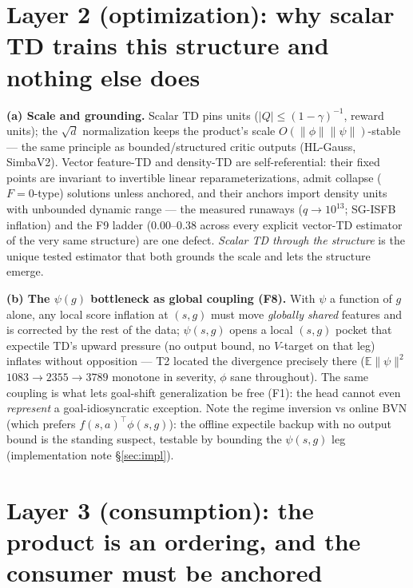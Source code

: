 \documentclass[11pt]{article}
\newcommand{\E}{\mathbb{E}}
\theoremstyle{definition}
\theoremstyle{remark}
\begin{document}
\section{Layer 2 (optimization): why scalar TD trains this structure and nothing else
does}\label{sec:layer2}

\textbf{(a) Scale and grounding.} Scalar TD pins units ($|Q|\le(1-\gamma)^{-1}$, reward
units); the $\sqrt d$ normalization keeps the product's scale $O(\|\phi\|\|\psi\|)$-stable
--- the same principle as bounded/structured critic outputs (HL-Gauss, SimbaV2). Vector
feature-TD and density-TD are self-referential: their fixed points are invariant to
invertible linear reparameterizations, admit collapse ($F{=}0$-type) solutions unless
anchored, and their anchors import density units with unbounded dynamic range --- the
measured runaways ($q\to10^{13}$; SG-ISFB inflation) and the F9 ladder ($0.00$--$0.38$
across every explicit vector-TD estimator of the very same structure) are one defect.
\emph{Scalar TD through the structure} is the unique tested estimator that both grounds the
scale and lets the structure emerge.

\textbf{(b) The $\psi(g)$ bottleneck as global coupling (F8).} With $\psi$ a function of $g$
alone, any local score inflation at $(s,g)$ must move \emph{globally shared} features and is
corrected by the rest of the data; $\psi(s,g)$ opens a local $(s,g)$ pocket that expectile
TD's upward pressure (no output bound, no $V$-target on that leg) inflates without
opposition --- T2 located the divergence precisely there ($\E\|\psi\|^2$
$1083\to2355\to3789$ monotone in severity, $\phi$ sane throughout). The same coupling is
what lets goal-shift generalization be free (F1): the head cannot even \emph{represent} a
goal-idiosyncratic exception. Note the regime inversion vs online BVN (which prefers
$f(s,a)^\top\phi(s,g)$): the offline expectile backup with no output bound is the standing
suspect, testable by bounding the $\psi(s,g)$ leg (implementation note \S\ref{sec:impl}).

\section{Layer 3 (consumption): the product is an ordering, and the consumer must be
anchored}\label{sec:layer3}
\end{document}
